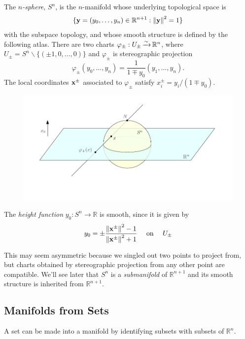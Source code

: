 \documentclass[a4paper,11pt]{article}
\begin{document}
	\begin{ex}
		The \emph{$n$-sphere}, $S^n$, is the $n$-manifold whose underlying topological space is
		\[
			\{\vb{y} = (y_0, \dots, y_n) \in \mathbb{R}^{n+1}: \norm{\vb{y}}^2 = 1\}
		\]
		with the subspace topology, and whose smooth structure is defined by the following atlas. There are two charts $\varphi_{\pm}: U_{\pm} \operatorname{\xrightarrow{\sim}} \mathbb{R}^n$, where $U_\pm = S^n \backslash \{(\pm 1, 0, \dots, 0)\}$ and $\varphi_{\pm}$ is stereographic projection
		\[
			\varphi_{\pm}(y_0, \dots, y_n) = \frac{1}{1 \mp y_0}(y_1, \dots, y_n).
		\]
		The local coordinates $\vb{x}^\pm$ associated to $\varphi_\pm$ satisfy $x^\pm_i = y_i / (1 \mp y_0)$.

		\begin{figure}[H]
			\centering
			\includegraphics[width=\linewidth]{fig/fig3.pdf}
		\end{figure}

		The \emph{height function} $y_0 : S^n \to \mathbb{R}$ is smooth, since it is given by
		\[
			y_0 = \pm \frac{\norm{\vb{x}^\pm}^2 - 1}{\norm{\vb{x}^\pm}^2 + 1}\quad\text{ on }\quad U_\pm
		\]
	\end{ex}

	\begin{rmk}
		This may seem asymmetric because we singled out two points to project from, but charts obtained by stereographic projection from any other point are compatible. We'll see later that $S^n$ is a \emph{submanifold} of $\mathbb{R}^{n+1}$ and its smooth structure is inherited from $\mathbb{R}^{n+1}$. 
	\end{rmk}

	\subsection{Manifolds from Sets} 

	A set can be made into a manifold by identifying subsets with subsets of $\mathbb{R}^n$.
\end{document}
